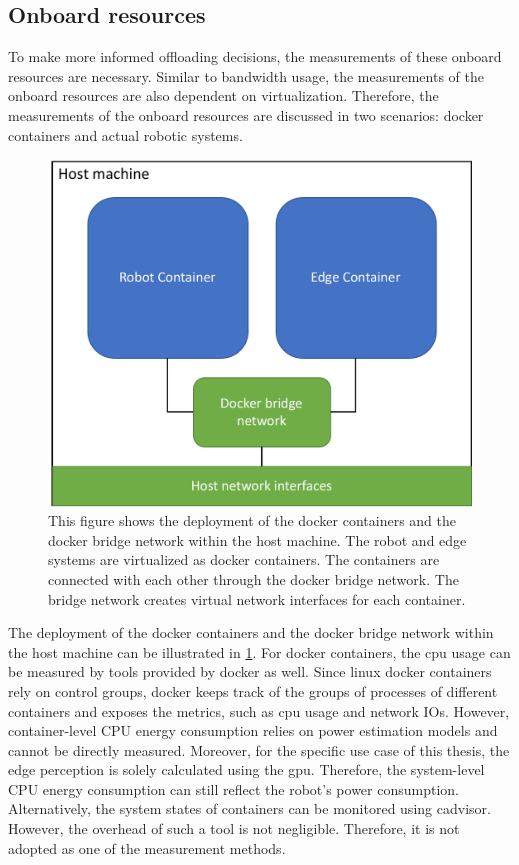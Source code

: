 \subsection{Onboard resources}

To make more informed offloading decisions, the measurements of these onboard resources are necessary. Similar to bandwidth usage, the measurements of the onboard resources are also dependent on virtualization. Therefore, the measurements of the onboard resources are discussed in two scenarios: \gls{docker} containers and actual robotic systems. 

\begin{figure}
    \centering
    \includegraphics[width=0.6\linewidth]{figures/setup/docker_containers.pdf}
    \caption[Deployment of \gls{docker} containers within the host machine]{This figure shows the deployment of the \gls{docker} containers and the docker bridge network within the host machine. The robot and edge systems are virtualized as \gls{docker} containers. The containers are connected with each other through the \gls{docker} bridge network. The bridge network creates virtual network interfaces for each container.}
    \label{fig:docker_containers}
\end{figure}

The deployment of the docker containers and the docker bridge network within the host machine can be illustrated in \cref{fig:docker_containers}. For \gls{docker} containers, the \gls{cpu} usage can be measured by tools provided by \gls{docker} as well. Since \gls{linux} \gls{docker} containers rely on control groups, \gls{docker} keeps track of the groups of processes of different containers and exposes the metrics, such as \gls{cpu} usage and network IOs. However, container-level CPU energy consumption relies on power estimation models and cannot be directly measured. Moreover, for the specific use case of this thesis, the edge perception is solely calculated using the \gls{gpu}. Therefore, the system-level CPU energy consumption can still reflect the robot's power consumption. Alternatively, the system states of containers can be monitored using \gls{cadvisor}. However, the overhead of such a tool is not negligible. Therefore, it is not adopted as one of the measurement methods. 

